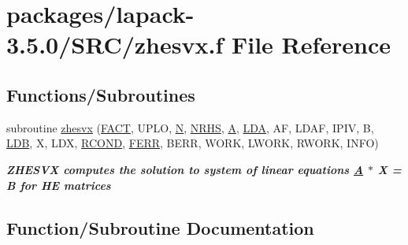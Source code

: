 \hypertarget{zhesvx_8f}{}\section{packages/lapack-\/3.5.0/\+S\+R\+C/zhesvx.f File Reference}
\label{zhesvx_8f}
\subsection*{Functions/\+Subroutines}
\begin{DoxyCompactItemize}
\item 
subroutine \hyperlink{zhesvx_8f_ac038d715449bf2a61671e2d2b09886a6}{zhesvx} (\hyperlink{superlu__enum__consts_8h_af00a42ecad444bbda75cde1b64bd7e72a1b6692b56d378abb85bd49063721d034}{F\+A\+C\+T}, U\+P\+L\+O, \hyperlink{polmisc_8c_a0240ac851181b84ac374872dc5434ee4}{N}, \hyperlink{example__user_8c_aa0138da002ce2a90360df2f521eb3198}{N\+R\+H\+S}, \hyperlink{classA}{A}, \hyperlink{example__user_8c_ae946da542ce0db94dced19b2ecefd1aa}{L\+D\+A}, A\+F, L\+D\+A\+F, I\+P\+I\+V, B, \hyperlink{example__user_8c_a50e90a7104df172b5a89a06c47fcca04}{L\+D\+B}, X, L\+D\+X, \hyperlink{superlu__enum__consts_8h_af00a42ecad444bbda75cde1b64bd7e72a9b5c151728d8512307565994c89919d5}{R\+C\+O\+N\+D}, \hyperlink{superlu__enum__consts_8h_af00a42ecad444bbda75cde1b64bd7e72a78fd14d7abebae04095cfbe02928f153}{F\+E\+R\+R}, B\+E\+R\+R, W\+O\+R\+K, L\+W\+O\+R\+K, R\+W\+O\+R\+K, I\+N\+F\+O)
\begin{DoxyCompactList}\small\item\em {\bfseries  Z\+H\+E\+S\+V\+X computes the solution to system of linear equations \hyperlink{classA}{A} $\ast$ X = B for H\+E matrices} \end{DoxyCompactList}\end{DoxyCompactItemize}


\subsection{Function/\+Subroutine Documentation}
\hypertarget{zhesvx_8f_ac038d715449bf2a61671e2d2b09886a6}{}

